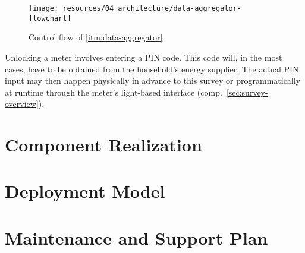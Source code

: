\begin{figure}[hbt]
  \centering
  \texttt{[image: resources/04\_architecture/data-aggregator-flowchart]}
  \caption{Control flow of \ref{itm:data-aggregator}}
  \label{fig:data-aggregator-control-flow}
\end{figure}

\FloatBarrier

Unlocking a meter involves entering a \acs{PIN} code. This code will, in the most cases, have to be obtained from the household's energy supplier. The actual \acs{PIN} input may then happen physically in advance to this survey or programmatically at runtime through the meter's light-based interface (comp.~\autoref{sec:survey-overview}).


\section{Component Realization}
\label{sec:component-realization}


\section{Deployment Model}
\label{sec:deployment-model}


\section{Maintenance and Support Plan}
\label{sec:maintenance-and-support-plan}

